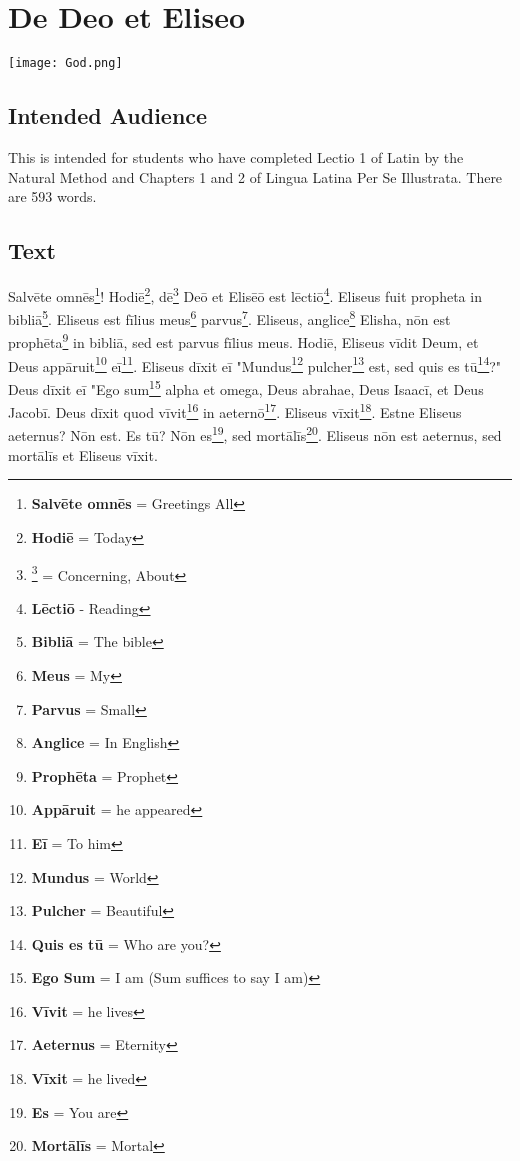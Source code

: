 \chapter{De Deo et Eliseo}
\begin{center}
\texttt{[image: God.png]}
\end{center}

\section{Intended Audience}
This is intended for students who have completed Lectio 1 of Latin by the Natural Method and Chapters 1 and 2 of Lingua Latina Per Se Illustrata. There are 593 words.

\section{Text}
Salvēte omnēs\footnote{\textbf{Salvēte omnēs} = Greetings All}! Hodiē\footnote{\textbf{Hodiē} = Today}, dē\footnote{\footnote{Dē} = Concerning, About} Deō et Elisēō est lēctiō\footnote{\textbf{Lēctiō} - Reading}. Eliseus fuit propheta in bibliā\footnote{\textbf{Bibliā} = The bible}. Eliseus est fīlius meus\footnote{\textbf{Meus} = My} parvus\footnote{\textbf{Parvus} = Small}. Eliseus, anglice\footnote{\textbf{Anglice} = In English} Elisha, nōn est prophēta\footnote{\textbf{Prophēta} = Prophet} in bibliā, sed est parvus fīlius meus. Hodiē, Eliseus vīdit Deum, et Deus appāruit\footnote{\textbf{Appāruit} = he appeared} eī\footnote{\textbf{Eī} = To him}. Eliseus dīxit eī "Mundus\footnote{\textbf{Mundus} = World} pulcher\footnote{\textbf{Pulcher} = Beautiful} est, sed quis es tū\footnote{\textbf{Quis es tū} = Who are you?}?" Deus dīxit eī "Ego sum\footnote{\textbf{Ego Sum} = I am (Sum suffices to say I am)} alpha et omega, Deus abrahae, Deus Isaacī, et Deus Jacobī. Deus dīxit quod vīvit\footnote{\textbf{Vīvit} = he lives} in aeternō\footnote{\textbf{Aeternus} = Eternity}. Eliseus vīxit\footnote{\textbf{Vīxit} = he lived}. Estne Eliseus aeternus? Nōn est. Es tū? Nōn es\footnote{\textbf{Es} = You are}, sed mortālīs\footnote{\textbf{Mortālīs} = Mortal}. Eliseus nōn est aeternus, sed mortālīs et Eliseus vīxit. \par
